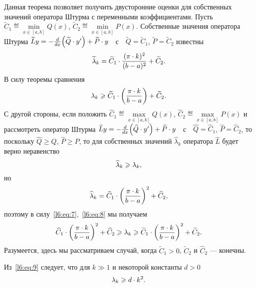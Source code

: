 Данная теорема позволяет получить двусторонние оценки для собственных значений оператора Штурма с переменными коэффициентами. Пусть $\widetilde{C}_1\eqdef\min\limits_{x\in[a,b]}Q(x)$, $\widetilde{C}_2\eqdef\min\limits_{x\in[a,b]}P(x)$. Собственные значения оператора Штурма $\widetilde{L}y=-\frac{d}{dx}\Big(\widetilde{Q}\cdot y'\Big)+\widetilde{P}\cdot y\quad$с$\quad\widetilde{Q}=\widetilde{C}_1$, $\widetilde{P}=\widetilde{C}_2$ известны 
\begin{equation*}
	\hfill\widetilde{\lambda}_k=\widetilde{C}_1\cdot\frac{(\pi\cdot k)^2}{(b-a)^2}+\widetilde{C}_2.\hfill
\end{equation*}
В силу теоремы сравнения
\begin{equation}
	\label{l6:eq:7}
	\hfill\lambda_k\geqslant\widetilde{C}_1\cdot\left(\frac{\pi\cdot k}{b-a}\right)+\widetilde{C}_2.\hfill
\end{equation}
С другой стороны, если положить $\widehat{C}_1\eqdef\max\limits_{x\in[a,b]}Q(x)$, $\widehat{C}_2\eqdef\max\limits_{x\in[a,b]}P(x)$ и рассмотреть оператор Штурма $\widehat{L}y=-\frac{d}{dx}\Big(\widehat{Q}\cdot y'\Big)+\widehat{P}\cdot y\quad$с$\quad\widehat{Q}=\widehat{C}_1$, $\widehat{P}=\widehat{C}_2$, то поскольку $\widehat{Q}\geqslant Q$, $\widehat{P}\geqslant P$, то для собственных значений $\widehat{\lambda}_k$ оператора $\widehat{L}$ будет верно неравенство
\begin{equation}
	\label{l6:eq:8}
	\hfill \widehat{\lambda}_k\geqslant\lambda_k,\hfill
\end{equation}
но 
\begin{equation*}
	\hfill\widehat{\lambda}_k=\widehat{C}_1\cdot \left(\frac{\pi\cdot k}{b-a}\right)^2+\widehat{C}_2,\hfill
\end{equation*}
поэтому в силу~\eqref{l6:eq:7},~\eqref{l6:eq:8} мы получаем
\begin{equation}
	\label{l6:eq:9}
	\hfill\widehat{C}_1\cdot\left(\frac{\pi\cdot k}{b-a}\right)^2+\widehat{C}_2\geqslant\lambda_k\geqslant\widetilde{C}_1\cdot\left(\frac{\pi\cdot k}{b-a}\right)^2+\widetilde{C}_2.\hfill
\end{equation}
Разумеется, здесь мы рассматриваем случай, когда $\widetilde{C}_1>0$, $\widetilde{C}_2$ и $\widehat{C}_2$ --- конечны. 

Из~\eqref{l6:eq:9} следует, что для $k\gg1$ и некоторой константы $d>0$ 
\begin{equation}
	\label{l6:eq:10}
	\hfill\lambda_k\geqslant d\cdot k^2.\hfill
\end{equation} 
